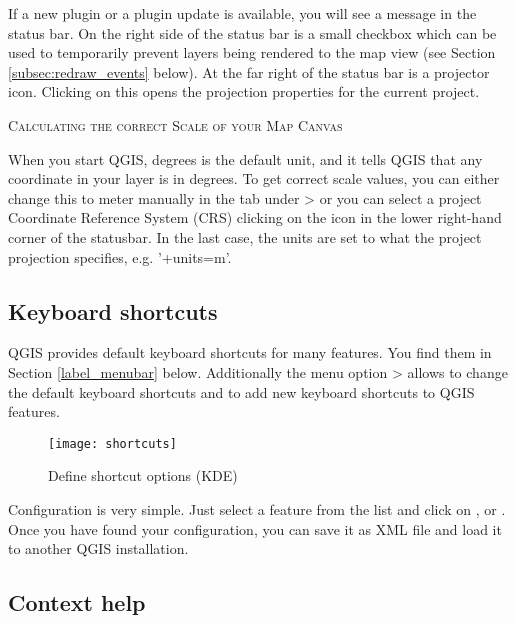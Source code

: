 If a new plugin or a plugin update is available, you will see a message in the 
status bar. On the right side of the status bar is a small
checkbox which can be used to temporarily prevent layers being rendered to the
map view (see Section \ref{subsec:redraw_events} below). At the far right of
the status bar is a projector icon. Clicking on this opens the projection
properties for the current project.

\begin{Tip}\caption{\textsc{Calculating the correct Scale of your Map Canvas}}
When you start QGIS, degrees is the default unit, and it tells QGIS 
that any coordinate in your layer is in degrees. To get correct scale values, 
you can either change this to meter manually in the  tab under 
 > or you can select a project 
Coordinate Reference System (CRS) clicking on the
icon in the lower right-hand corner of the statusbar. In the last case, the 
units are set to what the project projection specifies, e.g. '+units=m'.
\end{Tip}

\subsection{Keyboard shortcuts}\label{shortcuts}

QGIS provides default keyboard shortcuts for many features. You find them in
Section \ref{label_menubar} below. Additionally the menu option  >
 allows to change the default keyboard
shortcuts and to add new keyboard shortcuts to QGIS features.  

\begin{figure}[ht]
   \centering
   \texttt{[image: shortcuts]}
   \caption{Define shortcut options \nixcaption (KDE)} \label{fig:shortcuts}
\end{figure}

Configuration is very simple. Just select a feature from the list and click
on ,  or . Once you have
found your configuration, you can save it as XML file and load it to another
QGIS installation. 

\subsection{Context help}\label{context_help}

